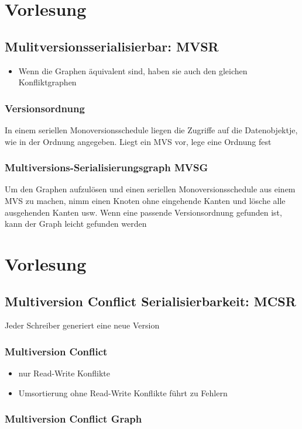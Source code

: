 \documentclass[ngerman]{scrartcl}
\begin{document}
\section{Vorlesung}
\subsection{Mulitversionsserialisierbar: MVSR}
\begin{itemize}
  \item Wenn die Graphen äquivalent sind, haben sie auch den gleichen Konfliktgraphen
\end{itemize}
\subsubsection{Versionsordnung}
In einem seriellen Monoversionsschedule liegen die Zugriffe auf die Datenobjektje, wie in der Ordnung angegeben. Liegt ein MVS vor, lege eine Ordnung fest 
\subsubsection{Multiversions-Serialisierungsgraph MVSG}
Um den Graphen aufzulösen und einen seriellen Monoversionsschedule aus einem MVS zu machen, nimm einen Knoten ohne eingehende Kanten und lösche alle ausgehenden Kanten usw. Wenn eine passende Versionsordnung gefunden ist, kann der Graph leicht gefunden werden

\section{Vorlesung}
\subsection{Multiversion Conflict Serialisierbarkeit: MCSR}
Jeder Schreiber generiert eine neue Version

\subsubsection{Multiversion Conflict}
\begin{itemize}
  \item nur Read-Write Konflikte
  \item Umsortierung ohne Read-Write Konflikte führt zu Fehlern
\end{itemize}

\subsubsection{Multiversion Conflict Graph}
\end{document}
